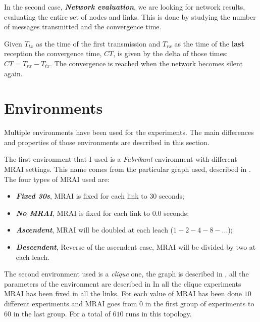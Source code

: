\documentclass[10pt,conference,letterpaper]{IEEEtran}
\begin{document}
In the second case, \textit{\textbf{Network evaluation}}, we are looking for
network results, evaluating the entire set of nodes and links.
This is done by studying the number of messages transmitted and the convergence time.

Given $T_{tx}$ as the time of the first transmission and $T_{rx}$ as the time of the
\textbf{last} reception the convergence time, $CT$, is given by the delta of those
times: $CT = T_{rx} - T_{tx}$.
The convergence is reached when the network becomes silent again.

\section{Environments}
\label{sec:input}

Multiple environments have been used for the experiments.
The main differences and properties of those environments are described in this
section.

The first environment that I used is a \textit{Fabrikant} environment with
different \ac{MRAI} settings.
This name comes from the particular graph used, described in .
The four types of \ac{MRAI} used are:
\begin{itemize}
	\item \textit{\textbf{Fixed 30s}}, \ac{MRAI} is fixed for each link to 30 seconds;
	\item \textit{\textbf{No MRAI}}, \ac{MRAI} is fixed for each link to 0.0 seconds;
	\item \textit{\textbf{Ascendent}}, \ac{MRAI} will be doubled at each leach ($1-2-4-8-...$);
	\item \textit{\textbf{Descendent}}, Reverse of the ascendent case, \ac{MRAI}
		will be divided by two at each leach.
\end{itemize}

The second environment used is a \textit{clique} one, the graph is described in ,
all the parameters of the environment are described in 
In all the clique experiments \ac{MRAI} has been fixed in all the links.
For each value of \ac{MRAI} has been done $10$ different experiments and \ac{MRAI}
goes from $0$ in the first group of experiments to $60$ in the last group.
For a total of $610$ runs in this topology.
\end{document}
